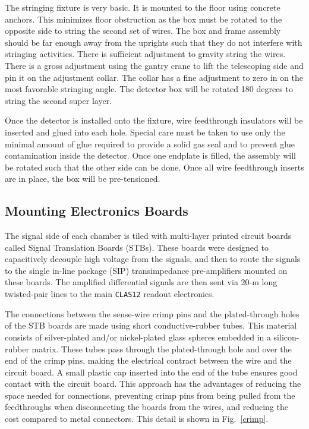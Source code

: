 \documentclass[12pt]{article}
\begin{document}
The stringing fixture is very basic.  It is mounted to the floor using 
concrete anchors. This minimizes floor obstruction as the box must be 
rotated to the opposite side to string the second set of wires. The box 
and frame assembly should be far enough away from the uprights such that 
they do not interfere with stringing activities. There is sufficient 
adjustment to gravity string the wires. There is a gross adjustment using 
the gantry crane to lift the telescoping side and pin it on the adjustment 
collar.  The collar has a fine adjustment to zero in on the most 
favorable stringing angle. The detector box will be rotated 180 degrees 
to string the second super layer.

Once the detector is installed onto the fixture, wire feedthrough 
insulators will be inserted and glued into each hole. Special care must 
be taken to use only the minimal amount of glue required to provide a
solid gas seal and to prevent glue contamination inside the detector. Once 
one endplate is filled, the assembly will be rotated such that the other 
side can be done. Once all wire feedthrough inserts are in place, the box 
will be pre-tensioned.

\subsection{Mounting Electronics Boards}

The signal side of each chamber is tiled with multi-layer printed circuit 
boards called Signal Translation Boards (STBs).  These boards were designed to 
capacitively decouple high voltage from the signals, and then to route the 
signals to the single in-line package (SIP) transimpedance pre-amplifiers 
mounted on these boards.  The amplified differential signals are then sent 
via 20-m long twisted-pair lines to the main {\tt CLAS12} readout electronics.

The connections between the sense-wire crimp pins and the plated-through holes 
of the STB boards are made using short conductive-rubber tubes.  This material 
consists of silver-plated and/or nickel-plated glass spheres embedded in a 
silicon-rubber matrix.  These tubes pass through the plated-through hole and 
over the end of the crimp pins, making the electrical contract between the wire 
and the circuit board.  A small plastic cap inserted into the end of the tube 
ensures good contact with the circuit board.  This approach has the advantages 
of reducing the space needed for connections, preventing crimp pins from being 
pulled from the feedthroughs when disconnecting the boards from the wires, and 
reducing the cost compared to metal connectors.  This detail is shown in
Fig.~\ref{crimp}.
\end{document}
